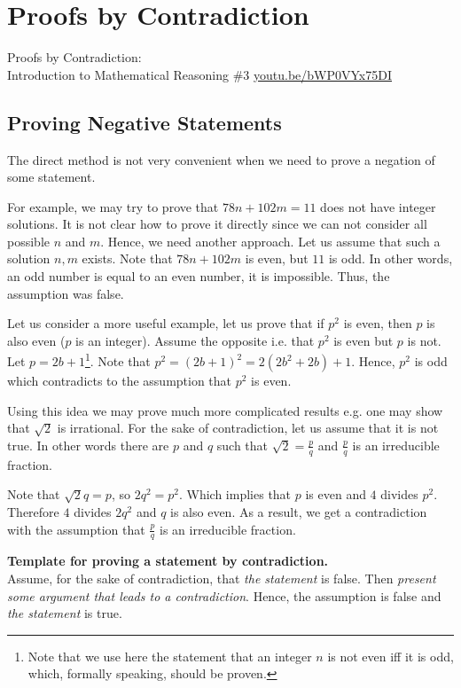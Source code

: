 \chapter{Proofs by Contradiction}
\begin{marginfigure}
  {\scriptsize Proofs by Contradiction:\\\noindent
  Introduction to Mathematical Reasoning \#3}
  \vskip 0.25cm
  \noindent
  \vskip 0.25cm
  \noindent
  \url{youtu.be/bWP0VYx75DI}
\end{marginfigure}
\section{Proving Negative Statements}
The direct method is not very convenient when we need to prove a negation of
some statement.

For example, we may try to prove that $78 n + 102 m = 11$ does not have integer
solutions. It is not clear how to prove it directly since we can not consider
all possible $n$ and $m$. Hence, we need another approach. Let us assume that
such a solution $n, m$ exists. Note that $78 n + 102 m$ is even, but $11$ is
odd. In other words, an odd number is equal to an even number, it is impossible.
Thus, the assumption was false.

Let us consider a more useful example, let us prove that if $p^2$ is even, then
$p$ is also even ($p$ is an integer). Assume the opposite i.e. that $p^2$ is
even but $p$ is not. Let $p = 2b + 1$\footnote{Note that we use here the
statement that an integer $n$ is not even iff it is odd, which, formally
speaking, should be proven.}. Note that $p^2 = (2b + 1)^2 = 2(2b^2 + 2b) + 1$.
Hence, $p^2$ is odd which contradicts to the assumption that $p^2$ is even.

Using this idea we may prove much more complicated results e.g. one may show
that $\sqrt{2}$ is irrational. For the sake of contradiction, let us assume
that it is not true. In other words there are $p$ and $q$ such that
$\sqrt{2} = \frac{p}{q}$ and $\frac{p}{q}$ is an irreducible fraction.

Note that $\sqrt{2} q = p$, so $2q^2 = p^2$. Which implies that $p$ is even
and $4$ divides $p^2$. Therefore $4$ divides $2q^2$ and $q$ is also even. As
a result, we get a contradiction with the assumption that $\frac{p}{q}$ is an
irreducible fraction.

\begin{template}
  \textbf{Template for proving a statement by contradiction.} \\

  Assume, for the sake of contradiction, that \textit{the statement} is false.
  Then \textit{present some argument that leads to a contradiction}. Hence, the
  assumption is false and \textit{the statement} is true.
\end{template}

